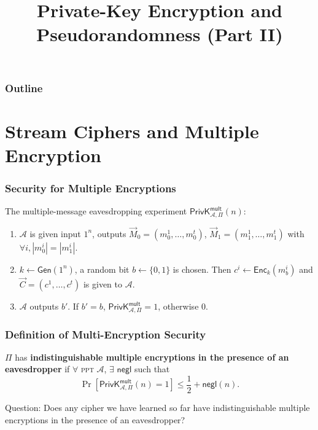 

\title{Private-Key Encryption and Pseudorandomness (Part II)}


\maketitle
\begin{frame}
\frametitle{Outline}
\tableofcontents
\end{frame}
\section{Stream Ciphers and Multiple Encryption}
\begin{frame}\frametitle{Security for Multiple Encryptions}
The multiple-message eavesdropping experiment $\mathsf{PrivK}^{\mathsf{mult}}_{\mathcal{A},\Pi}(n)$:
\begin{enumerate}
	\item $\mathcal{A}$ is given input $1^n$, outputs $\vec{M}_0=(m_0^1,\dots,m_0^t)$, $\vec{M}_1=(m_1^1,\dots,m_1^t)$ with $\forall i, |m_0^i| = |m_1^i|$.
	\item $k \gets \mathsf{Gen}(1^n)$, a random bit $b \gets \{0,1\}$ is chosen. Then $c^i \gets \mathsf{Enc}_k(m_b^i)$ and $\vec{C}=(c^1,\dots,c^t)$ is given to $\mathcal{A}$.
	\item $\mathcal{A}$ outputs $b'$. If $b' = b$, $\mathsf{PrivK}^{\mathsf{mult}}_{\mathcal{A},\Pi}=1$, otherwise 0.
\end{enumerate}
\begin{figure}
\begin{center}

\end{center}
\end{figure}
\end{frame}
\begin{frame}\frametitle{Definition of Multi-Encryption Security}
\begin{definition}\label{def:sme}
$\Pi$ has \textbf{indistinguishable multiple encryptions in the presence of an eavesdropper} if $\forall$ \textsc{ppt} $\mathcal{A}$, $\exists$ $\mathsf{negl}$ such that
\[ \Pr\left[\mathsf{PrivK}^{\mathsf{mult}}_{\mathcal{A},\Pi}(n)=1\right] \le \frac{1}{2} + \mathsf{negl}(n).
\]
\end{definition}
\begin{alertblock}{Question:}
Does any cipher we have learned so far have indistinguishable multiple encryptions in the presence of an eavesdropper?
\end{alertblock}
\end{frame}
